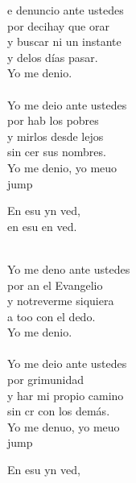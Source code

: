 \begin{cancion}%
	e denuncio ante ustedes \\
	por decihay que orar \\
	y  buscar ni un instante \\
	y delos días pasar. \\
	Yo me denio. \\
	\jump\\
	Yo me deio ante ustedes \\
	por hab los pobres \\
	y mirlos desde lejos \\
	sin cer sus nombres. \\
	Yo me denio, yo meuo\\jump\\
	\begin{chorus}%
	En esu yn ved, \\
	en esu en ved.\\
	\end{chorus}%
	\jump\\
	Yo me deno ante ustedes \\
	por an el Evangelio \\
	y notreverme siquiera \\
	a too con el dedo. \\
	Yo me denio. \\
	\jump\\
	Yo me deio ante ustedes \\
	por grimunidad \\
	y har mi propio camino \\
	sin cr con los demás. \\
	Yo me denuo, yo meuo\\jump\\
	\begin{chorus}%
	En esu yn ved, \\

\end{chorus}
\end{cancion}
